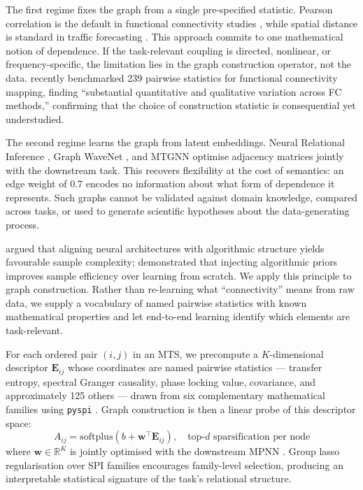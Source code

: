 \documentclass{article}
\theoremstyle{plain}
\begin{document}
The first regime fixes the graph from a single pre-specified statistic. Pearson correlation is the default in functional connectivity studies \citep{bullmore2009}, while spatial distance is standard in traffic forecasting \citep{li2018dcrnn}. This approach commits to one mathematical notion of dependence. If the task-relevant coupling is directed, nonlinear, or frequency-specific, the limitation lies in the graph construction operator, not the data. \citet{liu2025} recently benchmarked 239 pairwise statistics for functional connectivity mapping, finding ``substantial quantitative and qualitative variation across FC methods,'' confirming that the choice of construction statistic is consequential yet understudied.

The second regime learns the graph from latent embeddings. Neural Relational Inference \citep{kipf2018}, Graph WaveNet \citep{wu2019}, and MTGNN \citep{wu2020} optimise adjacency matrices jointly with the downstream task. This recovers flexibility at the cost of semantics: an edge weight of 0.7 encodes no information about what form of dependence it represents. Such graphs cannot be validated against domain knowledge, compared across tasks, or used to generate scientific hypotheses about the data-generating process.

\citet{velickovic2021} argued that aligning neural architectures with algorithmic structure yields favourable sample complexity; \citet{velickovic2022} demonstrated that injecting algorithmic priors improves sample efficiency over learning from scratch. We apply this principle to graph construction. Rather than re-learning what ``connectivity'' means from raw data, we supply a vocabulary of named pairwise statistics with known mathematical properties and let end-to-end learning identify which elements are task-relevant.

For each ordered pair $(i, j)$ in an MTS, we precompute a $K$-dimensional descriptor $\mathbf{E}_{ij}$ whose coordinates are named pairwise statistics --- transfer entropy, spectral Granger causality, phase locking value, covariance, and approximately 125 others --- drawn from six complementary mathematical families using \texttt{pyspi} \citep{cliff2023}. Graph construction is then a linear probe of this descriptor space:
%
\begin{equation}
A_{ij} = \mathrm{softplus}\!\left(b + \mathbf{w}^\top \mathbf{E}_{ij}\right), \quad \text{top-}d \text{ sparsification per node}
\end{equation}
%
where $\mathbf{w} \in \mathbb{R}^K$ is jointly optimised with the downstream MPNN \citep[cf.][]{alain2017}. Group lasso regularisation \citep{yuan2006} over SPI families encourages family-level selection, producing an interpretable statistical signature of the task's relational structure.
\end{document}
